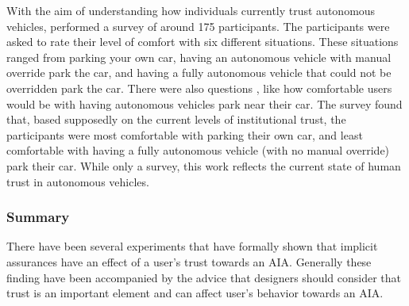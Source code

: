 With the aim of understanding how individuals currently trust autonomous vehicles, \citet{Munjal_Desai2009-en} performed a survey of around 175 participants. The participants were asked to rate their level of comfort with six different situations. These situations ranged from parking your own car, having an autonomous vehicle with manual override park the car, and having a fully autonomous vehicle that could not be overridden park the car. There were also questions , like how comfortable users would be with having autonomous vehicles park near their car. The survey found that, based supposedly on the current levels of institutional trust, the participants were most comfortable with parking their own car, and least comfortable with having a fully autonomous vehicle (with no manual override) park their car. While only a survey, this work reflects the current state of human trust in autonomous vehicles. 

\subsubsection{Summary}
There have been several experiments that have formally shown that implicit assurances have an effect of a user's trust towards an AIA. Generally these finding have been accompanied by the advice that designers should consider that trust is an important element and can affect user's behavior towards an AIA.  
